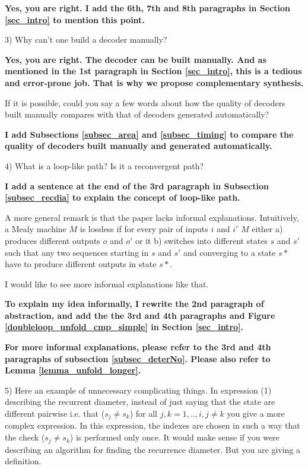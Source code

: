\documentclass[journal]{IEEEtran}
\begin{document}
\textbf{Yes,
you are right.
I add the 6th, 7th and 8th paragraphs in Section \ref{sec_intro} to mention this point.}

\bigskip

3) Why can't one build a decoder manually?


\smallskip

\textbf{Yes,
you are right.
The decoder can be built manually.
And as mentioned in the 1st paragraph in Section \ref{sec_intro},
this is a tedious and error-prone job.
That is why we propose complementary synthesis.}


\bigskip



If it is possible, could you say a few words about how the
quality of decoders built manually compares with that of decoders generated automatically?

\smallskip

\textbf{I add Subsections \ref{subsec_area} and \ref{subsec_timing} to compare the quality of decoders built
manually and generated automatically.}

\bigskip

4) What is a loop-like path? Is it a reconvergent path?
\smallskip

\textbf{I add a sentence at the end of the 3rd paragraph in Subsection \ref{subsec_recdia} to explain the concept of loop-like path.}

\bigskip

  A more general remark is that the paper lacks informal explanations.
  Intuitively, a Mealy machine $M$ is lossless if for every pair of inputs $i$ and $i'$
  $M$ either
    a) produces different outputs $o$ and $o'$  or it
    b) switches into  different states $s$ and $s'$ such that any two sequences starting in $s$ and $s'$ and converging
  to a state $s*$ have to produce different outputs in state $s*$.

 I would like to see more informal explanations like that.

\smallskip

\textbf{To explain my idea informally,
I rewrite the 2nd paragraph of abstraction,
and add the the 3rd and 4th paragraphs and Figure \ref{doubleloop_unfold_cmp_simple} in Section \ref{sec_intro}.
}

\textbf{For more informal explanations,
please refer to the 3rd and 4th paragraphs of subsection \ref{subsec_deterNo}.
Please also refer to Lemma \ref{lemma_unfold_longer}. }
\bigskip

5) Here an example of unnecessary complicating things. In expression (1) describing the recurrent diameter,
instead of just saying that the state are different pairwise
i.e. that ($s_j \ne s_k$) for all $j,k=1,..,i, j\ne k$  you give a more complex expression.
In this expression, the indexes are chosen in such a way that the check ($s_j \ne s_k$) is performed only once.
It would make sense if you were describing an algorithm for finding the recurrence diameter. But you are giving a definition.
\end{document}
